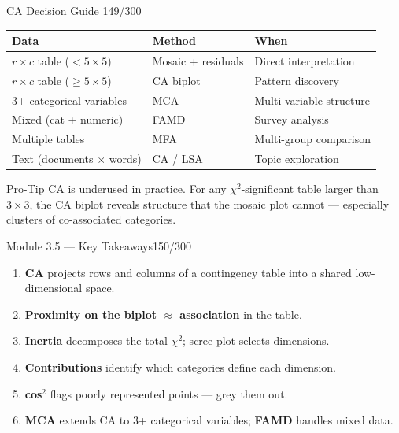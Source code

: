 \documentclass[10pt]{beamer}
\newcommand{\smark}[1]{\hfill{\scriptsize\color{codegray}#1}}
\begin{document}
\begin{frame}{CA Decision Guide}
\smark{149/300}
\centering\small
\begin{tabular}{@{}lll@{}}
    \toprule
    \textbf{Data} & \textbf{Method} & \textbf{When} \\
    \midrule
    $r \times c$ table ($< 5 \times 5$)    & Mosaic + residuals   & Direct interpretation \\
    $r \times c$ table ($\geq 5 \times 5$) & CA biplot            & Pattern discovery \\
    3+ categorical variables                & MCA                  & Multi-variable structure \\
    Mixed (cat + numeric)                   & FAMD                 & Survey analysis \\
    Multiple tables                         & MFA                  & Multi-group comparison \\
    Text (documents $\times$ words)         & CA / LSA             & Topic exploration \\
    \bottomrule
\end{tabular}

\vspace{0.3cm}
\begin{alertblock}{Pro-Tip}
    \scriptsize CA is underused in practice. For any $\chi^2$-significant table larger than $3 \times 3$, the CA biplot reveals structure that the mosaic plot cannot --- especially clusters of co-associated categories.
\end{alertblock}
\end{frame}

\begin{frame}{Module 3.5 --- Key Takeaways}\smark{150/300}
\begin{enumerate}
    \item \textbf{CA} projects rows and columns of a contingency table into a shared low-dimensional space.
    \item \textbf{Proximity on the biplot $\approx$ association} in the table.
    \item \textbf{Inertia} decomposes the total $\chi^2$; scree plot selects dimensions.
    \item \textbf{Contributions} identify which categories define each dimension.
    \item \textbf{cos$^2$} flags poorly represented points --- grey them out.
    \item \textbf{MCA} extends CA to 3+ categorical variables; \textbf{FAMD} handles mixed data.
\end{enumerate}
\end{frame}
\end{document}
